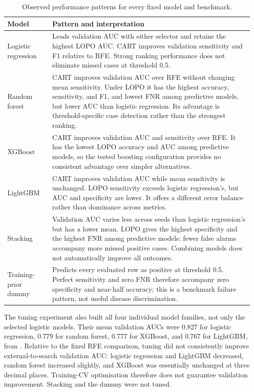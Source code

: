 \begin{table}[H]
\centering
\small
\caption{Observed performance patterns for every fixed model and benchmark.}
\label{tab:building-model-patterns}
\begin{tabularx}{\textwidth}{@{}p{2.8cm}X@{}}
\toprule
Model & Pattern and interpretation \\
\midrule
Logistic regression &
Leads validation AUC with either selector and retains the highest LOPO AUC.
CART improves validation sensitivity and F1 relative to RFE. Strong ranking
performance does not eliminate missed cases at threshold 0.5. \\
Random forest &
CART improves validation AUC over RFE without changing mean sensitivity.
Under LOPO it has the highest accuracy, sensitivity, and F1, and lowest FNR
among predictive models, but lower AUC than logistic regression. Its advantage
is threshold-specific case detection rather than the strongest ranking. \\
XGBoost &
CART improves validation AUC and sensitivity over RFE. It has the lowest
LOPO accuracy and AUC among predictive models, so the tested boosting
configuration provides no consistent advantage over simpler alternatives. \\
LightGBM &
CART improves validation AUC while mean sensitivity is unchanged. LOPO
sensitivity exceeds logistic regression's, but AUC and specificity are lower.
It offers a different error balance rather than dominance across metrics. \\
Stacking &
Validation AUC varies less across seeds than logistic regression's but has
a lower mean. LOPO gives the highest specificity and the highest FNR among
predictive models: fewer false alarms accompany more missed positive cases.
Combining models does not automatically improve all outcomes. \\
Training-prior dummy &
Predicts every evaluated row as positive at threshold 0.5. Perfect sensitivity
and zero FNR therefore accompany zero specificity and near-half accuracy;
this is a benchmark failure pattern, not useful disease discrimination. \\
\bottomrule
\end{tabularx}
\end{table}

The tuning experiment also built all four individual model families, not only
the selected logistic models. Their mean validation AUCs were 0.827 for
logistic regression, 0.779 for random forest, 0.777 for XGBoost, and 0.767
for LightGBM, from \protect{}. Relative to the fixed
RFE comparison, tuning did not consistently improve external-to-search
validation AUC: logistic regression and LightGBM decreased, random forest
increased slightly, and XGBoost was essentially unchanged at three decimal
places. Training-CV optimisation therefore does not guarantee validation
improvement. Stacking and the dummy were not tuned.

